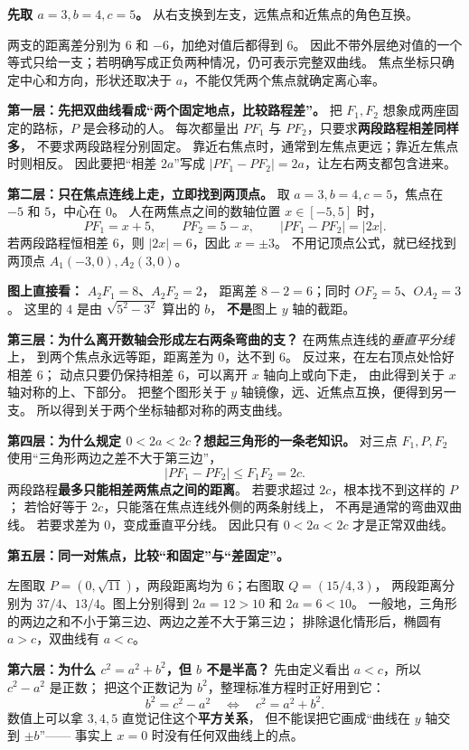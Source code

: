 \begin{explanationbox}
\textbf{先取 $a=3,b=4,c=5$。} 从右支换到左支，远焦点和近焦点的角色互换。

两支的距离差分别为 $6$ 和 $-6$，加绝对值后都得到 $6$。
因此不带外层绝对值的一个等式只给一支；若明确写成正负两种情况，仍可表示完整双曲线。
焦点坐标只确定中心和方向，形状还取决于 $a$，不能仅凭两个焦点就确定离心率。
\end{explanationbox}
\clearpage

\begin{explanationbox}
\textbf{第一层：先把双曲线看成“两个固定地点，比较路程差”。}
把 $F_1,F_2$ 想象成两座固定的路标，$P$ 是会移动的人。
每次都量出 $PF_1$ 与 $PF_2$，只要求\textbf{两段路程相差同样多}，
不要求两段路程分别固定。
靠近右焦点时，通常到左焦点更远；靠近左焦点时则相反。
因此要把“相差 $2a$”写成 $|PF_1-PF_2|=2a$，让左右两支都包含进来。

\textbf{第二层：只在焦点连线上走，立即找到两顶点。}
取 $a=3,b=4,c=5$，焦点在 $-5$ 和 $5$，中心在 $0$。
人在两焦点之间的数轴位置 $x\in[-5,5]$ 时，
\[
PF_1=x+5,\qquad PF_2=5-x,
\qquad |PF_1-PF_2|=|2x|.
\]
若两段路程恒相差 $6$，则 $|2x|=6$，因此 $x=\pm3$。
不用记顶点公式，就已经找到两顶点 $A_1(-3,0),A_2(3,0)$。

\textbf{图上直接看：} $A_2F_1=8$、$A_2F_2=2$，
距离差 $8-2=6$；同时 $OF_2=5$、$OA_2=3$。
这里的 $4$ 是由 $\sqrt{5^2-3^2}$ 算出的 $b$，
\textbf{不是}图上 $y$ 轴的截距。

\textbf{第三层：为什么离开数轴会形成左右两条弯曲的支？}
在两焦点连线的\emph{垂直平分线}上，
到两个焦点永远等距，距离差为 $0$，达不到 $6$。
反过来，在左右顶点处恰好相差 $6$；
动点只要仍保持相差 $6$，可以离开 $x$ 轴向上或向下走，
由此得到关于 $x$ 轴对称的上、下部分。
把整个图形关于 $y$ 轴镜像，远、近焦点互换，便得到另一支。
所以得到关于两个坐标轴都对称的两支曲线。
\end{explanationbox}
\clearpage
\begin{explanationbox}
\textbf{第四层：为什么规定 $0<2a<2c$？想起三角形的一条老知识。}
对三点 $F_1,P,F_2$ 使用“三角形两边之差不大于第三边”，
\[
|PF_1-PF_2|\le F_1F_2=2c.
\]
两段路程\textbf{最多只能相差两焦点之间的距离}。
若要求超过 $2c$，根本找不到这样的 $P$；
若恰好等于 $2c$，只能落在焦点连线外侧的两条射线上，
不再是通常的弯曲双曲线。
若要求差为 $0$，变成垂直平分线。
因此只有 $0<2a<2c$ 才是正常双曲线。

\end{explanationbox}
\clearpage
\begin{explanationbox}
\textbf{第五层：同一对焦点，比较“和固定”与“差固定”。}

左图取 $P=(0,\sqrt{11})$，两段距离均为 $6$；右图取 $Q=(15/4,3)$，
两段距离分别为 $37/4$、$13/4$。图上分别得到 $2a=12>10$ 和 $2a=6<10$。
一般地，三角形的两边之和不小于第三边、两边之差不大于第三边；
排除退化情形后，椭圆有 $a>c$，双曲线有 $a<c$。

\textbf{第六层：为什么 $c^2=a^2+b^2$，但 $b$ 不是半高？}
先由定义看出 $a<c$，所以 $c^2-a^2$ 是正数；
把这个正数记为 $b^2$，整理标准方程时正好用到它：
\[
b^2=c^2-a^2\quad\Longleftrightarrow\quad c^2=a^2+b^2.
\]
数值上可以拿 $3,4,5$ 直觉记住这个\textbf{平方关系}，
但不能误把它画成“曲线在 $y$ 轴交到 $\pm b$”——
事实上 $x=0$ 时没有任何双曲线上的点。
\end{explanationbox}
\clearpage
